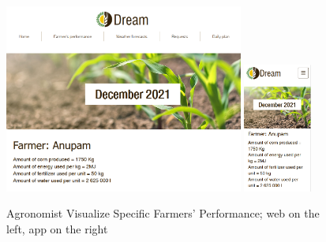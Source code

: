 \documentclass{article}
\begin{document}
        \begin{figure} [h]
            \centering
            \includegraphics[width=0.7\textwidth]{images/UserInterfaces/Agronomist/FarmersPerformance/SpecificPerformanceWeb.png}
            \quad
            \includegraphics[width=0.2\textwidth]{images/UserInterfaces/Agronomist/FarmersPerformance/SpecificPerformanceApp.png}
            \quad
            \caption{\label{fig:agronomistSpecificFarmersPerformance}Agronomist Visualize Specific Farmers' Performance; web on the left, app on the right}
        \end{figure}
    
    
    \newpage
    
\end{document}
